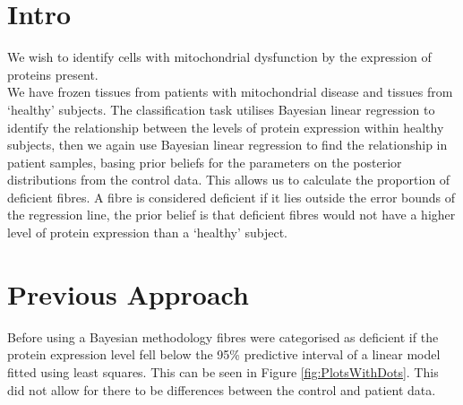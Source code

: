 \documentclass[a4paper, 12pt]{article}
\begin{document}
\section*{Intro}

We wish to identify cells with mitochondrial dysfunction by the expression of proteins present. \\
We have frozen tissues from patients with mitochondrial disease and tissues from `healthy' subjects. The classification task utilises Bayesian linear regression to identify the relationship between the levels of protein expression within healthy subjects, then we again use Bayesian linear regression to find the relationship in patient samples, basing prior beliefs for the parameters on the posterior distributions from the control data. This allows us to calculate the proportion of deficient fibres. A fibre is considered deficient if it lies outside the error bounds of the regression line, the prior belief is that deficient fibres would not have a higher level of protein expression than a `healthy' subject. 

\section*{Previous Approach}
Before using a Bayesian methodology fibres were categorised as deficient if the protein expression level fell below the 95\% predictive interval of a linear model fitted using least squares. This can be seen in Figure \ref{fig:PlotsWithDots}. This did not allow for there to be differences between the control and patient data. 
\end{document}
